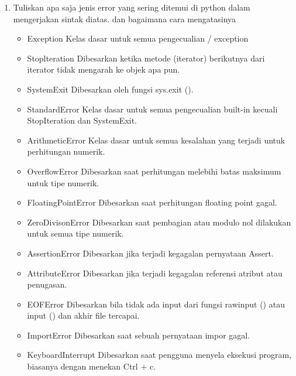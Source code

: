 \begin{enumerate}
    \item Tuliskan apa saja jenis error yang sering ditemui di python dalam mengerjakan
    sintak diatas. dan bagaimana cara mengatasinya
    \begin{itemize}
        \item Exception
        Kelas dasar untuk semua pengecualian / exception

        \item Stoplteration
        Dibesarkan ketika metode (iterator) berikutnya dari iterator tidak mengarah ke objek apa pun.

        \item SystemExit
        Dibesarkan oleh fungsi sys.exit ().

        \item StandardError
        Kelas dasar untuk semua pengecualian built-in kecuali StopIteration dan SystemExit.

        \item ArithmeticError
        Kelas dasar untuk semua kesalahan yang terjadi untuk perhitungan numerik.

        \item OverflowError
        Dibesarkan saat perhitungan melebihi batas maksimum untuk tipe numerik.

        \item FloatingPointError
        Dibesarkan saat perhitungan floating point gagal.

        \item ZeroDivisonError
        Dibesarkan saat pembagian atau modulo nol dilakukan untuk semua tipe numerik.

        \item AssertionError
        Dibesarkan jika terjadi kegagalan pernyataan Assert.

        \item AttributeError
        Dibesarkan jika terjadi kegagalan referensi atribut atau penugasan.
         
        \item EOFError
        Dibesarkan bila tidak ada input dari fungsi rawinput () atau input () dan akhir file tercapai.

        \item ImportError
        Dibesarkan saat sebuah pernyataan impor gagal.

        \item KeyboardInterrupt
        Dibesarkan saat pengguna menyela eksekusi program, biasanya dengan menekan Ctrl + c.


\end{itemize}
\end{enumerate}

